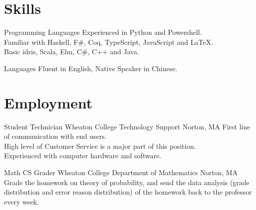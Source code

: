 \documentclass[11pt,a4paper,roman]{moderncv}        %
\begin{document}
\section{Skills}

\cventry{}
{Programming Languages}{}{}{}
{Experienced in Python and Powershell.\\
Familiar with Haskell, F\#, Coq, TypeScript, JavaScript and \LaTeX{}.\\
Basic idris, Scala, Elm, C\#, C++ and Java.}

\cventry{}
{Languages}{}{}{}
{Fluent in English, Native Speaker in Chinese.}



\section{Employment}
{Student Technician}
{Wheaton College Technology Support}
{Norton, MA}{}
{First line of communication with end users.\\
High level of Customer Service is a major part of this position.\\
Experienced with computer hardware and software.}

{Math CS Grader}
{Wheaton College Department of Mathematics}
{Norton, MA}{}
{Grade the homework on theory of probability,
and send the data analysis (grade distribution and error reason distribution)
of the homework back to the professor every week.}
\end{document}
